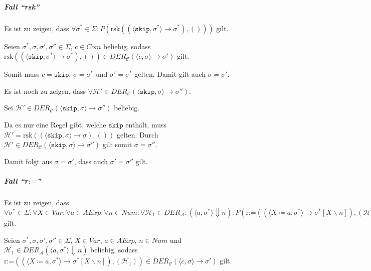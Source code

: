 																\subparagraph{Fall \enquote{rsk}}
																	Es ist zu zeigen, dass $ \forall \sigma ^ * \in \Sigma : P(\text{rsk}((\langle \texttt{skip}, \sigma ^ * \rangle \rightarrow \sigma ^ *), ())) $ gilt.

																	Seien $ \sigma ^ *, \sigma, \sigma', \sigma'' \in \Sigma $, $ c \in \textit{Com} $ beliebig, sodass $ \text{rsk}((\langle \texttt{skip}, \sigma ^ * \rangle \rightarrow \sigma ^ *), ()) \in \textit{DER} _ \mathcal{C} (\langle c, \sigma \rangle \rightarrow \sigma') $ gilt.

																	Somit muss $ c = \texttt{skip} $, $ \sigma = \sigma ^ * $ und $ \sigma' = \sigma ^ * $ gelten. Damit gilt auch $ \sigma = \sigma' $.

																	Es ist noch zu zeigen, dass $ \forall \mathcal{H}' \in \textit{DER} _ \mathcal{C} (\langle \texttt{skip}, \sigma \rangle \rightarrow \sigma'') $.

																	Sei $ \mathcal{H}' \in \textit{DER} _ \mathcal{C} (\langle \texttt{skip}, \sigma \rangle \rightarrow \sigma'') $ beliebig.

																	Da es nur eine Regel gibt, welche $ \texttt{skip} $ enthält, muss $ \mathcal{H}' = \text{rsk}((\langle \texttt{skip}, \sigma \rangle \rightarrow \sigma), ()) $ gelten. Durch $ \mathcal{H}' \in \textit{DER} _ \mathcal{C} (\langle \texttt{skip}, \sigma \rangle \rightarrow \sigma'') $ gilt somit $ \sigma = \sigma'' $.

																	Damit folgt aus $ \sigma = \sigma' $, dass auch $ \sigma' = \sigma'' $ gilt.

																\subparagraph{Fall \enquote{r:=}}
																	Es ist zu zeigen, dass $ \forall \sigma ^ * \in \Sigma : \forall X \in \textit{Var} : \forall a \in \textit{AExp} : \forall n \in \textit{Num} : \forall \mathcal{H} _ 1 \in \textit{DER} _ \mathcal{A} : (\langle a, \sigma ^ * \rangle \Downarrow n) : P(\text{r:=}((\langle X \coloneqq a, \sigma ^ * \rangle \rightarrow \sigma ^ * [X \backslash n]), (\mathcal{H} _ 1))) $ gilt.

																	Seien $ \sigma ^ *, \sigma, \sigma', \sigma'' \in \Sigma $, $ X \in \textit{Var} $, $ a \in \textit{AExp} $, $ n \in \textit{Num} $ und $ \mathcal{H} _ 1 \in \textit{DER} _ \mathcal{A} (\langle a, \sigma ^ * \rangle \Downarrow n) $ beliebig, sodass $ \text{r:=}((\langle X \coloneqq a, \sigma ^ * \rangle \rightarrow \sigma ^ * [X \backslash n]), (\mathcal{H} _ 1)) \in \textit{DER} _ \mathcal{C} (\langle c, \sigma \rangle \rightarrow \sigma') $ gilt.

